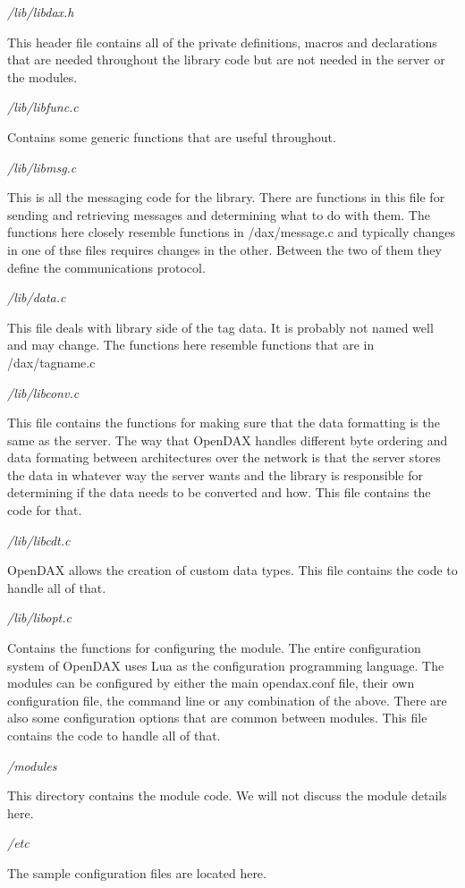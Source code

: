 \emph{/lib/libdax.h}

This header file contains all of the private definitions, macros and declarations that are needed throughout the library code but are not needed in the server or the modules.

\emph{/lib/libfunc.c}

Contains some generic functions that are useful throughout.

\emph{/lib/libmsg.c}

This is all the messaging code for the library. There are functions in this file for sending and retrieving messages and determining what to do with them. The functions here closely resemble functions in /dax/message.c and typically changes in one of thse files requires changes in the other. Between the two of them they define the
communications protocol.

\emph{/lib/data.c}

This file deals with library side of the tag data. It is probably not named well and may change. The functions here resemble functions that are in /dax/tagname.c

\emph{/lib/libconv.c}

This file contains the functions for making sure that the data formatting is the same as the server. The way that OpenDAX handles different byte ordering and data formating between architectures over the network is that the server stores the data in whatever way the server wants and the library is responsible for determining if the data needs to be converted and how. This file contains the code for that.

\emph{/lib/libcdt.c}

OpenDAX allows the creation of custom data types. This file contains the code to handle all of that.

\emph{/lib/libopt.c}

Contains the functions for configuring the module. The entire configuration system of OpenDAX uses Lua as the configuration programming language. The modules can be configured by either the main opendax.conf file, their own configuration file, the command line or any combination of the above. There are also some configuration options that are common between modules. This file contains the code to handle all of that.

\emph{/modules}

This directory contains the module code. We will not discuss the module details here.

\emph{/etc}

The sample configuration files are located here.

